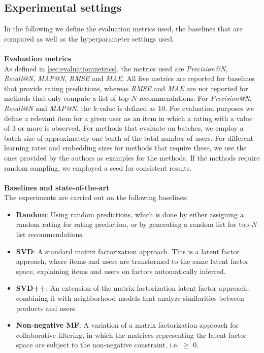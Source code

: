 \subsection{Experimental settings}
In the following we define the evaluation metrics used, the baselines that are compared as well as the hyperparameter settings used.
\\\\
\textbf{Evaluation metrics}\\
As defined in \autoref{sec:evaluationmetrics}, the metrics used are \textit{Precision@N}, \textit{Recall@N}, \textit{MAP@N}, \textit{RMSE} and \textit{MAE}.
All five metrics are reported for baselines that provide rating predictions, whereas \textit{RMSE} and \textit{MAE} are not reported for methods that only compute a list of top-$N$ recommendations.
For \textit{Precision@N}, \textit{Recall@N} and \textit{MAP@N}, the $k$-value is defined as $10$.
For evaluation purposes we define a relevant item for a given user as an item in which a rating with a value of $3$ or more is observed.
For methods that evaluate on batches, we employ a batch size of approximately one tenth of the total number of users.
For different learning rates and embedding sizes for methods that require these, we use the ones provided by the authors as examples for the methods. 
If the methods require random sampling, we employed a seed for consistent results.
\\\\
\textbf{Baselines and state-of-the-art}\\
The experiments are carried out on the following baselines:
\begin{itemize}
    \item \textbf{Random}: Using random predictions, which is done by either assigning a random rating for rating prediction, or by generating a random list for top-$N$ list recommendations.
    \item \textbf{SVD}: A standard matrix factorization approach. This is a latent factor approach, where items and users are transformed to the same latent factor space, explaining items and users on factors automatically inferred.
    \item \textbf{SVD++}: An extension of the matrix factorization latent factor approach, combining it with neighborhood models that analyze similarities between products and users.
    \item \textbf{Non-negative MF}: A variation of a matrix factorization approach for collaborative filtering, in which the matrices representing the latent factor space are subject to the non-negative constraint, i.e. $\geq$ 0.
\end{itemize}

